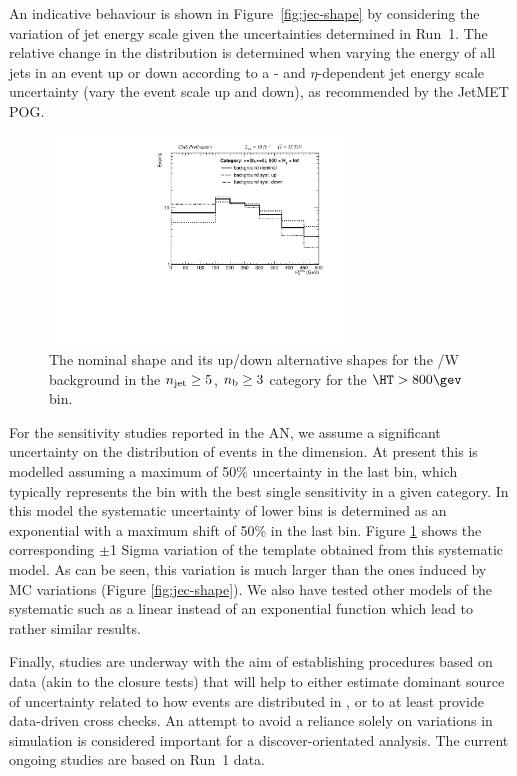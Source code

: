 An indicative behaviour is shown in Figure~\ref{fig:jec-shape} by
considering the variation of jet energy scale given the uncertainties
determined in Run~1. The relative change in the \mht distribution is
determined when varying the energy of all jets in an event up or down
according to a \pt- and $\eta$-dependent jet energy scale uncertainty
(\ie vary the event scale up and down), as recommended by the JetMET
POG. 

\begin{figure}[]
  \centering
  \includegraphics[width=0.7\textwidth]{figures/mhtShapeSyst/MHTShapeSyst_ge3b_ge5j_800_Inf.pdf}
  \caption{\label{fig:mht-shape-syst-toy} 
    The nominal \mht shape and its up/down alternative shapes for the \ttbar/W background in the $n_{\text{jet}} \geq5$, $n_{\text{b}} \geq 3$
    category for the $\HT > 800 \gev$ bin.
  }
\end{figure}

For the sensitivity studies reported in the AN, we assume a significant 
uncertainty on the distribution of events in the \mht dimension. 
At present this is modelled assuming a maximum of 50\% uncertainty in the last \mht bin, 
which typically represents the bin with the best single sensitivity in a given \scalht category. 
In this model the systematic uncertainty of lower \mht bins is determined 
as an exponential with a maximum shift of 50\% in the last \mht bin. 
Figure \ref{fig:mht-shape-syst-toy} shows the corresponding $\pm$1 Sigma variation of the 
\mht template obtained from this systematic model. 
As can be seen, this variation is much larger than the ones induced by MC variations (Figure \ref{fig:jec-shape}).  
We also have tested other models of the \mht systematic such as a linear instead of an exponential function which lead to rather similar results. 

Finally, studies are underway with the aim of establishing procedures
based on data (akin to the closure tests) that will help to either
estimate dominant source of uncertainty related to how events are
distributed in \mht, or to at least provide data-driven cross checks.
An attempt to avoid a reliance solely on variations in simulation is
considered important for a discover-orientated analysis. The current
ongoing studies are based on Run~1 data.

